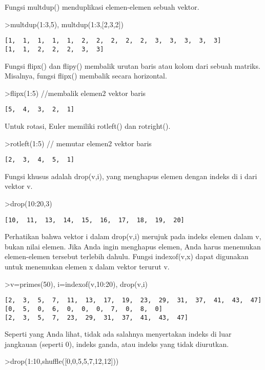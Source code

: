 \documentclass[
]{book}
\begin{document}
Fungsi multdup() menduplikasi elemen-elemen sebuah vektor.

\textgreater multdup(1:3,5), multdup(1:3,{[}2,3,2{]})

\begin{verbatim}
[1,  1,  1,  1,  1,  2,  2,  2,  2,  2,  3,  3,  3,  3,  3]
[1,  1,  2,  2,  2,  3,  3]
\end{verbatim}

Fungsi flipx() dan flipy() membalik urutan baris atau kolom dari sebuah matriks. Misalnya, fungsi flipx() membalik secara horizontal.

\textgreater flipx(1:5) //membalik elemen2 vektor baris

\begin{verbatim}
[5,  4,  3,  2,  1]
\end{verbatim}

Untuk rotasi, Euler memiliki rotleft() dan rotright().

\textgreater rotleft(1:5) // memutar elemen2 vektor baris

\begin{verbatim}
[2,  3,  4,  5,  1]
\end{verbatim}

Fungsi khusus adalah drop(v,i), yang menghapus elemen dengan indeks di i dari vektor v.

\textgreater drop(10:20,3)

\begin{verbatim}
[10,  11,  13,  14,  15,  16,  17,  18,  19,  20]
\end{verbatim}

Perhatikan bahwa vektor i dalam drop(v,i) merujuk pada indeks elemen dalam v, bukan nilai elemen. Jika Anda ingin menghapus elemen, Anda harus menemukan elemen-elemen tersebut terlebih dahulu. Fungsi indexof(v,x) dapat digunakan untuk menemukan elemen x dalam vektor terurut v.

\textgreater v=primes(50), i=indexof(v,10:20), drop(v,i)

\begin{verbatim}
[2,  3,  5,  7,  11,  13,  17,  19,  23,  29,  31,  37,  41,  43,  47]
[0,  5,  0,  6,  0,  0,  0,  7,  0,  8,  0]
[2,  3,  5,  7,  23,  29,  31,  37,  41,  43,  47]
\end{verbatim}

Seperti yang Anda lihat, tidak ada salahnya menyertakan indeks di luar jangkauan (seperti 0), indeks ganda, atau indeks yang tidak diurutkan.

\textgreater drop(1:10,shuffle({[}0,0,5,5,7,12,12{]}))
\end{document}
